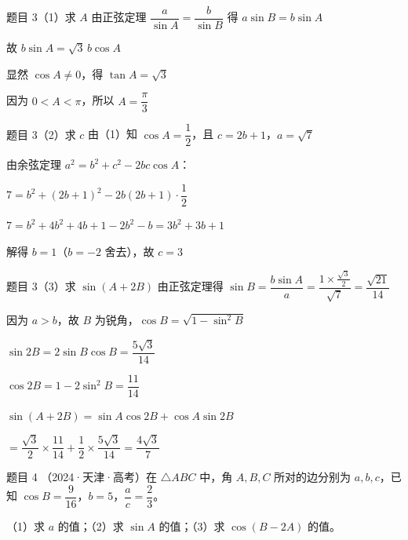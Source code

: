 \documentclass[UTF8]{ctexbeamer}
\begin{document}
	\begin{frame}{题目 3（1）\quad 求 $A$}
		由正弦定理 $\dfrac{a}{\sin A} = \dfrac{b}{\sin B}$ 得 $a\sin B = b\sin A$
		\pause
		
		故 $b\sin A = \sqrt{3}\,b\cos A$
		\pause
		
		显然 $\cos A \neq 0$，得 $\tan A = \sqrt{3}$
		\pause
		
		因为 $0 < A < \pi$，所以 $A = \dfrac{\pi}{3}$
	\end{frame}
	
	\begin{frame}{题目 3（2）\quad 求 $c$}
		由（1）知 $\cos A = \dfrac{1}{2}$，且 $c = 2b + 1$，$a = \sqrt{7}$
		\pause
		
		由余弦定理 $a^2 = b^2 + c^2 - 2bc\cos A$：
		\pause
		
		$7 = b^2 + (2b+1)^2 - 2b(2b+1) \cdot \dfrac{1}{2}$
		\pause
		
		$7 = b^2 + 4b^2 + 4b + 1 - 2b^2 - b = 3b^2 + 3b + 1$
		\pause
		
		解得 $b = 1$（$b = -2$ 舍去），故 $c = 3$
	\end{frame}
	
	\begin{frame}{题目 3（3）\quad 求 $\sin(A+2B)$}
		由正弦定理得 $\sin B = \dfrac{b\sin A}{a} = \dfrac{1 \times \frac{\sqrt{3}}{2}}{\sqrt{7}} = \dfrac{\sqrt{21}}{14}$
		\pause
		
		因为 $a > b$，故 $B$ 为锐角，$\cos B = \sqrt{1 - \sin^2 B}$
		\pause
		
		$\sin 2B = 2\sin B\cos B = \dfrac{5\sqrt{3}}{14}$
		\pause
		
		$\cos 2B = 1 - 2\sin^2 B = \dfrac{11}{14}$
		\pause
		
		\vspace{0.2cm}
		$\sin(A+2B) = \sin A\cos 2B + \cos A\sin 2B$
		\pause
		
		$= \dfrac{\sqrt{3}}{2} \times \dfrac{11}{14} + \dfrac{1}{2} \times \dfrac{5\sqrt{3}}{14} = \dfrac{4\sqrt{3}}{7}$
	\end{frame}
	
	\begin{frame}{题目 4}
		（2024·天津·高考）在 $\triangle ABC$ 中，角 $A, B, C$ 所对的边分别为 $a, b, c$，已知 $\cos B = \dfrac{9}{16}$，$b = 5$，$\dfrac{a}{c} = \dfrac{2}{3}$。
		
		\vspace{0.3cm}
		（1）求 $a$ 的值；\quad （2）求 $\sin A$ 的值；\quad （3）求 $\cos(B-2A)$ 的值。
	\end{frame}
	
\end{document}
